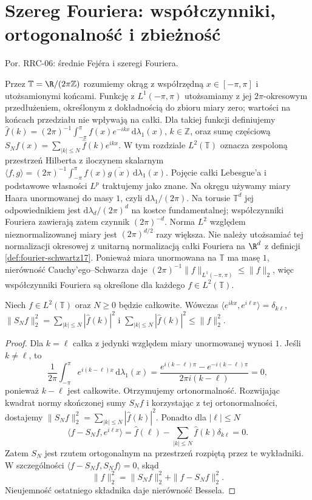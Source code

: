 \setcounter{section}{27}
\section{Szereg Fouriera: współczynniki, ortogonalność i zbieżność}
\label{sec:dt-series-fourier}
\providecommand{\atlasref}[2]{#2}

Por. \atlasref{PDE-06::thm:pde6-fejer}{RRC-06: średnie Fejéra i szeregi Fouriera}.


Przez $\mathbb T=\R/(2\pi\mathbb Z)$ rozumiemy okrąg z
współrzędną $x\in[-\pi,\pi]$ i utożsamionymi końcami.
Funkcję z $L^1(-\pi,\pi)$ utożsamiamy z jej
$2\pi$-okresowym przedłużeniem, określonym z dokładnością
do zbioru miary zero; wartości na końcach przedziału
nie wpływają na całki. Dla takiej funkcji definiujemy
$\widehat f(k)=(2\pi)^{-1}\int_{-\pi}^{\pi}f(x)e^{-ikx}\,\mathrm d\lambda_1(x)$,
$k\in\mathbb Z$, oraz sumę częściową
$S_Nf(x)=\sum_{|k|\le N}\widehat f(k)e^{ikx}$.
W tym rozdziale $L^2(\mathbb T)$ oznacza zespoloną przestrzeń Hilberta
z iloczynem skalarnym
$\langle f,g\rangle=(2\pi)^{-1}\int_{-\pi}^{\pi}f(x)\overline{g(x)}\,\mathrm d\lambda_1(x)$.
Pojęcie całki Lebesgue'a i podstawowe własności $L^p$
traktujemy jako znane. Na okręgu używamy miary Haara
unormowanej do masy $1$, czyli $\mathrm d\lambda_1/(2\pi)$.
Na torusie $\mathbb T^d$ jej odpowiednikiem jest
$\mathrm d\lambda_d/(2\pi)^d$ na kostce fundamentalnej;
współczynniki Fouriera zawierają zatem czynnik $(2\pi)^{-d}$.
Norma $L^2$ względem nieznormalizowanej miary jest
$(2\pi)^{d/2}$ razy większa. Nie należy utożsamiać tej
normalizacji okresowej z unitarną normalizacją całki
Fouriera na $\R^d$ z definicji \ref{def:fourier-schwartz17}.
Ponieważ miara unormowana na
$\mathbb T$ ma masę $1$, nierówność Cauchy'ego--Schwarza
daje $(2\pi)^{-1}\|f\|_{L^1(-\pi,\pi)}\leq\|f\|_2$,
więc współczynniki Fouriera są określone dla każdego
$f\in L^2(\mathbb T)$.

\begin{lemat}
\label{lem:dt-series-bessel}
Niech $f\in L^2(\mathbb T)$ oraz $N\geq0$ będzie całkowite. Wówczas
$\langle e^{ikx},e^{i\ell x}\rangle=\delta_{k\ell}$,
$\|S_Nf\|_2^2=\sum_{|k|\le N}|\widehat f(k)|^2$ i
$\sum_{|k|\le N}|\widehat f(k)|^2\le\|f\|_2^2$.
\end{lemat}
\begin{proof}
Dla $k=\ell$ całka z jedynki względem miary
unormowanej wynosi $1$. Jeśli $k\ne\ell$, to
\[
 \frac1{2\pi}\int_{-\pi}^{\pi}e^{i(k-\ell)x}\,
 \mathrm d\lambda_1(x)
 =\frac{e^{i(k-\ell)\pi}-e^{-i(k-\ell)\pi}}
 {2\pi i(k-\ell)}=0,
\]
ponieważ $k-\ell$ jest całkowite. Otrzymujemy
ortonormalność. Rozwijając kwadrat normy skończonej
sumy $S_Nf$ i korzystając z tej ortonormalności,
dostajemy $\|S_Nf\|_2^2=\sum_{|k|\le N}|\widehat f(k)|^2$.
Ponadto dla $|\ell|\leq N$
\[
 \langle f-S_Nf,e^{i\ell x}\rangle
 =\widehat f(\ell)-\sum_{|k|\leq N}
 \widehat f(k)\delta_{k\ell}=0.
\]
Zatem $S_N$ jest rzutem ortogonalnym na przestrzeń
rozpiętą przez te wykładniki. W szczególności
$\langle f-S_Nf,S_Nf\rangle=0$, skąd
\[
 \|f\|_2^2=\|S_Nf\|_2^2+\|f-S_Nf\|_2^2.
\]
Nieujemność ostatniego składnika daje nierówność Bessela.
\end{proof}

